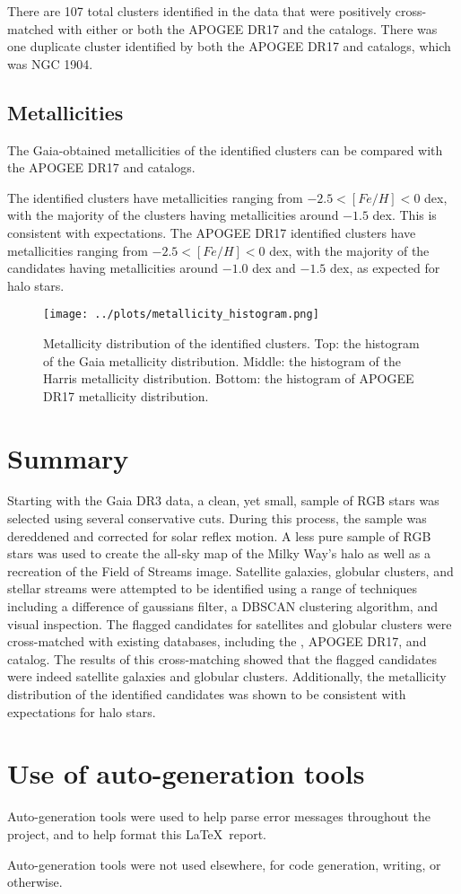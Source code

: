 \documentclass[11pt,a4paper]{article}
\begin{document}
There are 107 total clusters identified in the data that were positively cross-matched with either or both the APOGEE DR17 and the \citeauthor{harris2010newcatalogglobularclusters} catalogs. There was one duplicate cluster identified by both the APOGEE DR17 and \citeauthor{harris2010newcatalogglobularclusters} catalogs, which was NGC 1904.

\subsection{Metallicities}
\label{sec:metallicities}
The Gaia-obtained metallicities of the identified clusters can be compared with the APOGEE DR17 and \citeauthor{harris2010newcatalogglobularclusters} catalogs.

The \citeauthor{harris2010newcatalogglobularclusters} identified clusters have metallicities ranging from $-2.5 < [Fe/H] < 0$ dex, with the majority of the clusters having metallicities around $-1.5$ dex. This is consistent with expectations. The APOGEE DR17 identified clusters have metallicities ranging from $-2.5 < [Fe/H] < 0 $ dex, with the majority of the candidates having metallicities around $-1.0$ dex and $-1.5$ dex, as expected for halo stars.

\begin{figure}
    \centering
    \texttt{[image: ../plots/metallicity\_histogram.png]}
    \caption{Metallicity distribution of the identified clusters. Top: the histogram of the Gaia metallicity distribution. Middle: the histogram of the Harris metallicity distribution. Bottom: the histogram of APOGEE DR17 metallicity distribution.}
    \label{fig:metallicity}
\end{figure}

\section{Summary}
Starting with the Gaia DR3 data, a clean, yet small, sample of RGB stars was selected using several conservative cuts. During this process, the sample was dereddened and corrected for solar reflex motion. A less pure sample of RGB stars was used to create the all-sky map of the Milky Way's halo as well as a recreation of the Field of Streams image. Satellite galaxies, globular clusters, and stellar streams were attempted to be identified using a range of techniques including a difference of gaussians filter, a DBSCAN clustering algorithm, and visual inspection. The flagged candidates for satellites and globular clusters were cross-matched with existing databases, including the \citeauthor{2020ApJ...893...47D}, APOGEE DR17, and \citeauthor{harris2010newcatalogglobularclusters} catalog. The results of this cross-matching showed that the flagged candidates were indeed satellite galaxies and globular clusters. Additionally, the metallicity distribution of the identified candidates was shown to be consistent with expectations for halo stars.
\clearpage


\appendix
\section{Use of auto-generation tools}
Auto-generation tools were used to help parse error messages throughout the project, and to help format this \LaTeX\ report.

Auto-generation tools were not used elsewhere, for code generation, writing, or otherwise.
\end{document}
